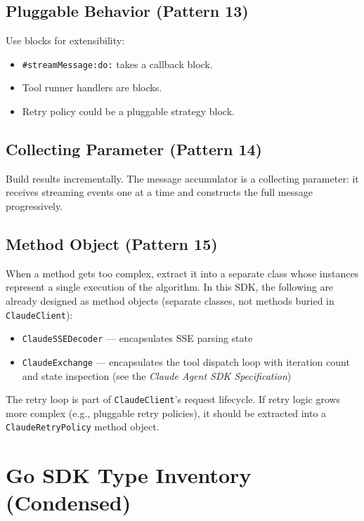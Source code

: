 \documentclass[a4paper,10pt,fleqn]{article}
\newcommand{\cls}[1]{\texttt{#1}}
\newcommand{\sel}[1]{\texttt{\##1}}
\begin{document}
\subsection{Pluggable Behavior (Pattern 13)}

Use blocks for extensibility:

\begin{itemize}
  \item \sel{streamMessage:do:} takes a callback block.
  \item Tool runner handlers are blocks.
  \item Retry policy could be a pluggable strategy block.
\end{itemize}

\subsection{Collecting Parameter (Pattern 14)}

Build results incrementally.  The message accumulator is a collecting
parameter: it receives streaming events one at a time and constructs the
full message progressively.

\subsection{Method Object (Pattern 15)}

When a method gets too complex, extract it into a separate class whose
instances represent a single execution of the algorithm.  In this SDK,
the following are already designed as method objects (separate classes,
not methods buried in \cls{ClaudeClient}):

\begin{itemize}
  \item \cls{ClaudeSSEDecoder} --- encapsulates SSE parsing state
  \item \cls{ClaudeExchange} --- encapsulates the tool dispatch loop
    with iteration count and state inspection (see the
    \emph{Claude Agent SDK Specification})
\end{itemize}

The retry loop is part of \cls{ClaudeClient}'s request lifecycle.  If
retry logic grows more complex (e.g., pluggable retry policies), it
should be extracted into a \cls{ClaudeRetryPolicy} method object.

\section{Go SDK Type Inventory (Condensed)}
\label{notes:type-inventory}
\end{document}

